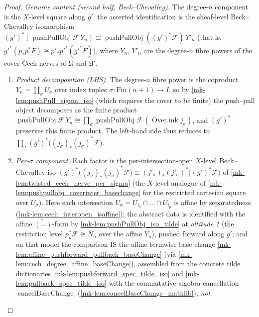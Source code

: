 \begin{proof}
  \emph{Genuine content (second half, Beck--Chevalley).} The degree-\(n\) component
  is the \(X\)-level square along \(g'\): the asserted identification is the sheaf-level
  Beck--Chevalley isomorphism \((g')^*(\operatorname{pushPullObj}\mathcal{F}\, Y_n) \cong
  \operatorname{pushPullObj}((g')^*\mathcal{F})\, Y'_n\) (that is, \(g'^*(p_* p^* F) \cong
  p'_* p'^*(g'^* F)\)), where \(Y_n\), \(Y'_n\) are the degree-\(n\) fibre powers of the
  cover {\v C}ech nerves of \(\mathfrak{U}\) and \(\mathfrak{U}'\).
  \begin{enumerate}
    \item \emph{Product decomposition (LHS).} The degree-\(n\) fibre power is the coproduct
      \(Y_n = \coprod_\sigma U_\sigma\) over index tuples \(\sigma : \mathrm{Fin}(n+1) \to I\),
      so by \ref{mk-lem:pushPull_sigma_iso} (which requires the cover to be finite) the push--pull
      object decomposes as the finite product \(\operatorname{pushPullObj}\mathcal{F}\, Y_n \cong
      \prod_\sigma \operatorname{pushPullObj}\mathcal{F}\,(\operatorname{Over.mk} j_\sigma)\),
      and \((g')^*\) preserves this finite product. The left-hand side thus reduces to
      \(\prod_\sigma (g')^*\bigl((j_\sigma)_*(j_\sigma)^*\mathcal{F}\bigr)\).
    \item \emph{Per-\(\sigma\) component.} Each factor is the per-intersection-open \(X\)-level
      Beck--Chevalley iso \((g')^*\bigl((j_\sigma)_*(j_\sigma)^*\mathcal{F}\bigr) \cong
      (j'_\sigma)_*(j'_\sigma)^*\bigl((g')^*\mathcal{F}\bigr)\) of
      \ref{mk-lem:twisted_cech_nerve_per_sigma} (the \(X\)-level analogue of
      \ref{mk-lem:pushpullobj_coverinter_basechange} for the restricted cartesian square over
      \(U_\sigma\)). Here each intersection \(U_\sigma = U_{i_0} \cap \dots \cap U_{i_p}\) is
      affine by separatedness (\ref{mk-lem:cech_interopen_isaffine}); the abstract data is
      identified with the affine \(\widetilde{(-)}\)-form by \ref{mk-lem:pushPullObj_iso_tilde}
      at \emph{altitude 1} (the restriction level \(p_n^*\mathcal{F} \cong \widetilde{N_n}\)
      over the affine \(Y_n\)), pushed forward along \(g'\); and on that model the comparison
      IS the affine termwise base change \ref{mk-lem:affine_pushforward_pullback_baseChange}
      (via \ref{mk-lem:cech_degree_affine_baseChange}), assembled from the concrete tilde
      dictionaries \ref{mk-lem:pushforward_spec_tilde_iso} and
      \ref{mk-lem:pullback_spec_tilde_iso} with the commutative-algebra cancellation
      \(\operatorname{cancelBaseChange}\) (\ref{mk-lem:cancelBaseChange_mathlib}), \emph{not}

\end{enumerate}
\end{proof}
